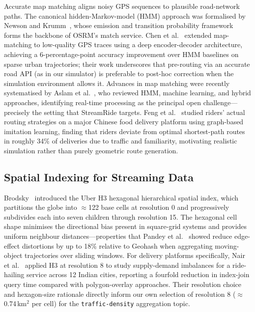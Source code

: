 \documentclass[conference]{IEEEtran}
\begin{document}
Accurate map matching aligns noisy GPS sequences to plausible
road-network paths. The canonical hidden-Markov-model (HMM) approach
was formalised by Newson and Krumm~\cite{newson2009map}, whose
emission and transition probability framework forms the backbone of
OSRM's match service. Chen et al.~\cite{chen2023l2mm} extended
map-matching to low-quality GPS traces using a deep encoder-decoder
architecture, achieving a 6-percentage-point accuracy improvement
over HMM baselines on sparse urban trajectories; their work underscores
that pre-routing via an accurate road API (as in our simulator) is
preferable to post-hoc correction when the simulation environment
allows it. Advances in map matching were recently systematised
by Aslam et al.~\cite{aslam2024mapmatch}, who reviewed HMM, machine
learning, and hybrid approaches, identifying real-time processing
as the principal open challenge—precisely the setting that
StreamRide targets. Feng et al.~\cite{feng2023ilroute} studied riders'
actual routing strategies on a major Chinese food delivery platform
using graph-based imitation learning, finding that riders deviate from
optimal shortest-path routes in roughly 34\% of deliveries due to
traffic and familiarity, motivating realistic simulation rather than
purely geometric route generation.

\subsection{Spatial Indexing for Streaming Data}

Brodsky~\cite{brodsky2018h3} introduced the Uber H3 hexagonal
hierarchical spatial index, which partitions the globe into
$\approx$122 base cells at resolution 0 and progressively subdivides
each into seven children through resolution 15. The hexagonal
cell shape minimises the directional bias present in square-grid
systems and provides uniform neighbour distances—properties
that Pandey et al.~\cite{pandey2018spatial} showed reduce
edge-effect distortions by up to 18\% relative to Geohash when
aggregating moving-object trajectories over sliding windows. For
delivery platforms specifically, Nair et al.~\cite{nair2022geospatial}
applied H3 at resolution 8 to study supply-demand imbalances for a
ride-hailing service across 12 Indian cities, reporting a fourfold
reduction in index-join query time compared with polygon-overlay
approaches. Their resolution choice and hexagon-size rationale directly
inform our own selection of resolution 8 ($\approx$0.74\,km$^2$ per cell)
for the \texttt{traffic-density} aggregation topic.
\end{document}

